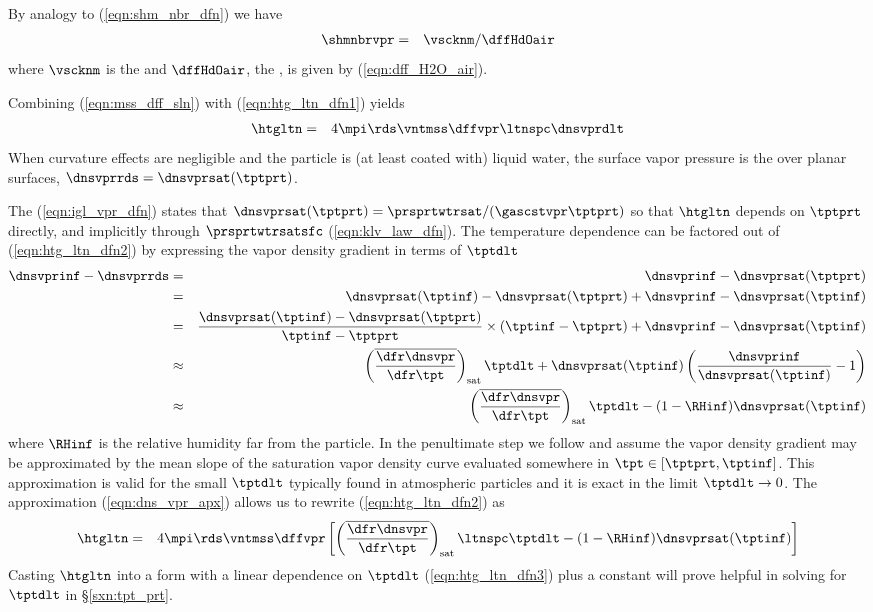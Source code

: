 \documentclass[12pt,twoside]{book}
\begin{document}
By analogy to (\ref{eqn:shm_nbr_dfn}) we have
\begin{eqnarray}
\shmnbrvpr & = & \vscknm / \dffHdOair
\label{eqn:shm_nbr_vpr_dfn}
\end{eqnarray}
where $\vscknm$ is the  and 
$\dffHdOair$, the , is given by
(\ref{eqn:dff_H2O_air}).

Combining (\ref{eqn:mss_dff_sln}) with (\ref{eqn:htg_ltn_dfn1}) 
yields 
\begin{eqnarray}
\htgltn & = & 4 \mpi \rds \vntmss \dffvpr \ltnspc \dnsvprdlt
\label{eqn:htg_ltn_dfn2}
\end{eqnarray}
When curvature effects are negligible and the particle is
(at least coated with) liquid water, the surface vapor pressure  
is the  over planar surfaces,
$\dnsvprrds = \dnsvprsat(\tptprt)$. 

The  (\ref{eqn:igl_vpr_dfn}) states that 
$\dnsvprsat(\tptprt) = \prsprtwtrsat / ( \gascstvpr \tptprt )$ 
so that $\htgltn$ depends on $\tptprt$ directly, and implicitly
through $\prsprtwtrsatsfc$ (\ref{eqn:klv_law_dfn}).
The temperature dependence can be factored out of
(\ref{eqn:htg_ltn_dfn2}) by expressing the vapor density gradient in
terms of $\tptdlt$
\begin{eqnarray}
\dnsvprinf - \dnsvprrds 
& = & 
\dnsvprinf - \dnsvprsat ( \tptprt )
\nonumber \\ 
& = & 
\dnsvprsat ( \tptinf ) - \dnsvprsat ( \tptprt ) +
\dnsvprinf - \dnsvprsat ( \tptinf )
\nonumber \\ 
& = & 
\frac{\dnsvprsat ( \tptinf ) - \dnsvprsat ( \tptprt )}{\tptinf - \tptprt} 
\times ( \tptinf - \tptprt ) +
\dnsvprinf - \dnsvprsat ( \tptinf )
\nonumber \\ 
& \approx & 
\left( \overline{\frac{\dfr\dnsvpr}{\dfr\tpt}} \right)_{\mathrm{sat}} 
\tptdlt +
\dnsvprsat ( \tptinf ) 
\left( \frac{\dnsvprinf}{\dnsvprsat ( \tptinf )} - 1 \right)
\nonumber \\ 
& \approx & 
\left( \overline{\frac{\dfr\dnsvpr}{\dfr\tpt}} \right)_{\mathrm{sat}} 
\tptdlt -
( 1 - \RHinf ) \dnsvprsat ( \tptinf ) 
\label{eqn:dns_vpr_apx}
\end{eqnarray}
where $\RHinf$ is the relative humidity far from the particle.
In the penultimate step we follow \cite{PrK98} and assume the vapor
density gradient may be approximated by the mean slope of the
saturation vapor density curve evaluated somewhere in 
$\tpt \in [\tptprt, \tptinf]$.
This approximation is valid for the small $\tptdlt$ typically found in
atmospheric particles and it is exact in the limit
$\tptdlt \rightarrow 0$.  
The approximation (\ref{eqn:dns_vpr_apx}) allows us to rewrite 
(\ref{eqn:htg_ltn_dfn2}) as 
\begin{eqnarray}
\htgltn & = & 4 \mpi \rds \vntmss \dffvpr \left[
\left( \overline{\frac{\dfr\dnsvpr}{\dfr\tpt}} \right)_{\mathrm{sat}} 
\ltnspc \tptdlt
 - ( 1 - \RHinf ) \dnsvprsat ( \tptinf ) \right]
\label{eqn:htg_ltn_dfn3}
\end{eqnarray}
Casting $\htgltn$ into a form with a linear dependence on $\tptdlt$ 
(\ref{eqn:htg_ltn_dfn3}) plus a constant will prove helpful in solving
for $\tptdlt$ in \S\ref{sxn:tpt_prt}.
\end{document}
